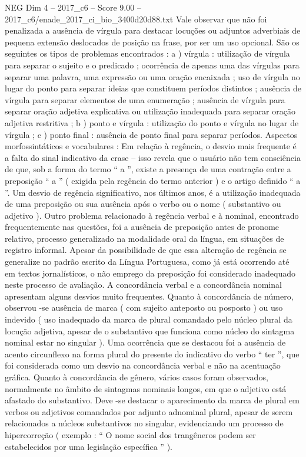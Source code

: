 \begin{textsample}{NEG Dim 4 – 2017\_c6 – Score 9.00 – 2017\_c6/enade\_2017\_ci\_bio\_3400d20d88.txt}
Vale observar que não foi penalizada a ausência de vírgula para destacar locuções ou adjuntos adverbiais de pequena extensão deslocados de posição na frase, por ser um uso opcional.
São os seguintes os tipos de problemas encontrados : a ) vírgula : utilização de vírgula para separar o sujeito e o predicado ; ocorrência de apenas uma das vírgulas para separar uma palavra, uma expressão ou uma oração encaixada ; uso de vírgula no lugar do ponto para separar ideias que constituem períodos distintos ; ausência de vírgula para separar elementos de uma enumeração ; ausência de vírgula para separar oração adjetiva explicativa ou utilização inadequada para separar oração adjetiva restritiva ; b ) ponto e vírgula : utilização do ponto e vírgula no lugar de vírgula ; c ) ponto final : ausência de ponto final para separar períodos.
Aspectos morfossintáticos e vocabulares : Em relação à regência, o desvio mais frequente é a falta do sinal indicativo da crase – isso revela que o usuário não tem consciência de que, sob a forma do termo “ a ”, existe a presença de uma contração entre a preposição “ a ” ( exigida pela regência do termo anterior ) e o artigo definido “ a ”.
Um desvio de regência significativo, nos últimos anos, é a utilização inadequada de uma preposição ou sua ausência após o verbo ou o nome ( substantivo ou adjetivo ).
Outro problema relacionado à regência verbal e à nominal, encontrado frequentemente nas questões, foi a ausência de preposição antes de pronome relativo, processo generalizado na modalidade oral da língua, em situações de registro informal.
Apesar da possibilidade de que essa alteração de regência se generalize no padrão escrito da Língua Portuguesa, como já está ocorrendo até em textos jornalísticos, o não emprego da preposição foi considerado inadequado neste processo de avaliação.
A concordância verbal e a concordância nominal apresentam alguns desvios muito frequentes.
Quanto à concordância de número, observou -se ausência de marca ( com sujeito anteposto ou posposto ) ou uso indevido ( uso inadequado da marca de plural comandado pelo núcleo plural da locução adjetiva, apesar de o substantivo que funciona como núcleo do sintagma nominal estar no singular ).
Uma ocorrência que se destacou foi a ausência de acento circunflexo na forma plural do presente do indicativo do verbo “ ter ”, que foi considerada como um desvio na concordância verbal e não na acentuação gráfica.
Quanto à concordância de gênero, vários casos foram observados, normalmente no âmbito de sintagmas nominais longos, em que o adjetivo está afastado do substantivo.
Deve -se destacar o aparecimento da marca de plural em verbos ou adjetivos comandados por adjunto adnominal plural, apesar de serem relacionados a núcleos substantivos no singular, evidenciando um processo de hipercorreção ( exemplo : “ O nome social dos trangêneros podem ser estabelecidos por uma legislação específica ” ).

\end{textsample}
